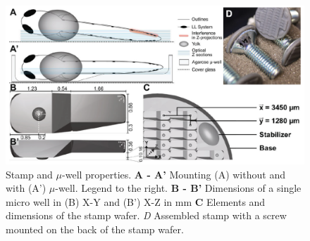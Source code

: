 \documentclass[11pt,singlespacinge,twoside]{reedthesis} %
\theoremstyle{definition}
\theoremstyle{definition}
\theoremstyle{definition}
\theoremstyle{remark}
\begin{document}
\begin{figure}

{\centering \includegraphics[width=0.95\linewidth]{figures/results/00_methods/mounting/stamp_dims} 

}

\caption[Stamp and micro-well properties]{Stamp and \(\mu\)-well properties. \textbf{A - A'} Mounting (A) without and with (A') \(\mu\)-well. Legend to the right. \textbf{B - B'} Dimensions of a single micro well in (B) X-Y and (B') X-Z in mm \textbf{C} Elements and dimensions of the stamp wafer. \emph{D} Assembled stamp with a screw mounted on the back of the stamp wafer.}\label{fig:mountmicro}
\end{figure}
\end{document}
